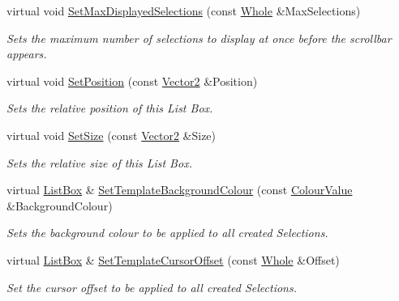 \begin{DoxyCompactItemize}
virtual void \hyperlink{classphys_1_1UI_1_1ListBox_acbc8e669d93665789453cb866996411b}{SetMaxDisplayedSelections} (const \hyperlink{namespacephys_a460f6bc24c8dd347b05e0366ae34f34a}{Whole} \&MaxSelections)
\begin{DoxyCompactList}\small\item\em Sets the maximum number of selections to display at once before the scrollbar appears. \item\end{DoxyCompactList}\item 
virtual void \hyperlink{classphys_1_1UI_1_1ListBox_a0c4c7141142caca342157ce4460b907d}{SetPosition} (const \hyperlink{classphys_1_1Vector2}{Vector2} \&Position)
\begin{DoxyCompactList}\small\item\em Sets the relative position of this List Box. \item\end{DoxyCompactList}\item 
virtual void \hyperlink{classphys_1_1UI_1_1ListBox_a2e1f6514f83be768dad7e357beb6ac98}{SetSize} (const \hyperlink{classphys_1_1Vector2}{Vector2} \&Size)
\begin{DoxyCompactList}\small\item\em Sets the relative size of this List Box. \item\end{DoxyCompactList}\item 
virtual \hyperlink{classphys_1_1UI_1_1ListBox}{ListBox} \& \hyperlink{classphys_1_1UI_1_1ListBox_a718421466aa6769b04b5e34b29e0e01b}{SetTemplateBackgroundColour} (const \hyperlink{classphys_1_1ColourValue}{ColourValue} \&BackgroundColour)
\begin{DoxyCompactList}\small\item\em Sets the background colour to be applied to all created Selections. \item\end{DoxyCompactList}\item 
virtual \hyperlink{classphys_1_1UI_1_1ListBox}{ListBox} \& \hyperlink{classphys_1_1UI_1_1ListBox_af2a439b21e1b1a4af0cc684c25109d60}{SetTemplateCursorOffset} (const \hyperlink{namespacephys_a460f6bc24c8dd347b05e0366ae34f34a}{Whole} \&Offset)
\begin{DoxyCompactList}\small\item\em Set the cursor offset to be applied to all created Selections. \item\end{DoxyCompactList}\item 

\end{DoxyCompactItemize}
